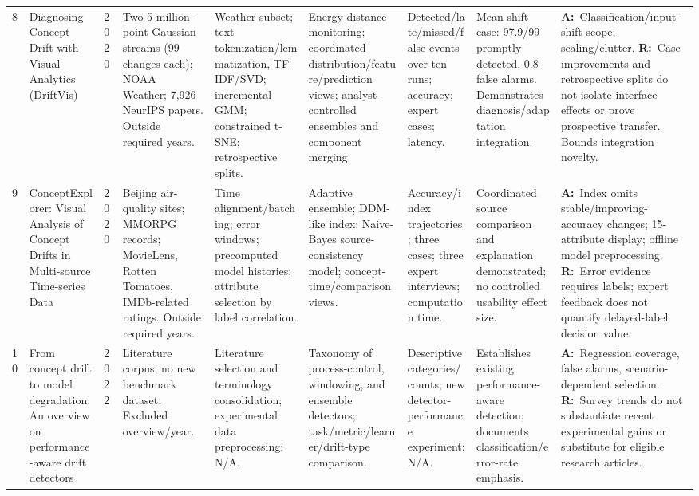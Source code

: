 \documentclass[10pt,a4paper]{article}
\newcommand{\A}{\textbf{A:}\ }
\newcommand{\R}{\textbf{R:}\ }
\begin{document}
\begin{landscape}
\begin{longtable}{L{0.4cm}L{3.55cm}L{0.95cm}L{2.6cm}L{2.7cm}L{2.65cm}L{2.2cm}L{2.4cm}L{4.1cm}}
8 & Diagnosing Concept Drift with Visual Analytics (DriftVis) \cite{driftvis} &
2020 & Two 5-million-point Gaussian streams (99 changes each); NOAA Weather; 7,926 NeurIPS papers. Outside required years. &
Weather subset; text tokenization/lemmatization, TF-IDF/SVD; incremental GMM; constrained t-SNE; retrospective splits. &
Energy-distance monitoring; coordinated distribution/feature/prediction views; analyst-controlled ensembles and component merging. &
Detected/late/missed/false events over ten runs; accuracy; expert cases; latency. &
Mean-shift case: 97.9/99 promptly detected, 0.8 false alarms. Demonstrates diagnosis/adaptation integration. &
\A Classification/input-shift scope; scaling/clutter.
\R Case improvements and retrospective splits do not isolate interface effects or prove prospective transfer. Bounds integration novelty.\\[4pt]

9 & ConceptExplorer: Visual Analysis of Concept Drifts in Multi-source Time-series Data \cite{conceptexplorer} &
2020 & Beijing air-quality sites; MMORPG records; MovieLens, Rotten Tomatoes, IMDb-related ratings. Outside required years. &
Time alignment/batching; error windows; precomputed model histories; attribute selection by label correlation. &
Adaptive ensemble; DDM-like index; Naive-Bayes source-consistency model; concept-time/comparison views. &
Accuracy/index trajectories; three cases; three expert interviews; computation time. &
Coordinated source comparison and explanation demonstrated; no controlled usability effect size. &
\A Index omits stable/improving-accuracy changes; 15-attribute display; offline model preprocessing.
\R Error evidence requires labels; expert feedback does not quantify delayed-label decision value.\\[4pt]

10 & From concept drift to model degradation: An overview on performance-aware drift detectors \cite{bayram} &
2022 & Literature corpus; no new benchmark dataset. Excluded overview/year. &
Literature selection and terminology consolidation; experimental data preprocessing: N/A. &
Taxonomy of process-control, windowing, and ensemble detectors; task/metric/learner/drift-type comparison. &
Descriptive categories/counts; new detector-performance experiment: N/A. &
Establishes existing performance-aware detection; documents classification/error-rate emphasis. &
\A Regression coverage, false alarms, scenario-dependent selection.
\R Survey trends do not substantiate recent experimental gains or substitute for eligible research articles.\\
\end{longtable}
\end{landscape}
\end{document}
